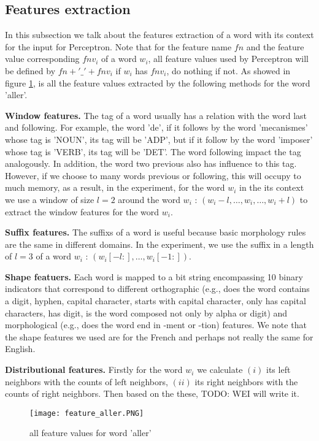\documentclass{article}
\begin{document}
\subsection{Features extraction}
In this subsection we talk about the features extraction of a word with its context for the input for Perceptron. Note that for the feature name $fn$ and  the feature value corresponding $fnv_i$ of a word $w_i$, all feature values used by Perceptron will be defined by $fn + '\_' + fnv_i$ if $w_i$ has $fnv_i$, do nothing if not. As showed in figure \ref{figure1}, is all the feature values extracted by the following methods for the word 'aller'.

\textbf{Window features.} The tag of a word usually has a relation with the word last and following. For example, the word 'de', if it follows by the word 'mecanismes' whose tag is 'NOUN', its tag will be 'ADP', but if it follow by the word 'imposer' whose tag is 'VERB', its tag will be 'DET'. The word following impact the tag analogously. In addition, the word two previous also has influence to this tag. However, if we choose to many words previous or following, this will occupy to much memory, as a result, in the experiment, for the word $w_i$ in the its context we use a window of size $l = 2$ around the word $w_i$ : $(w_i-l,\dots, w_i,\dots, w_i+l )$ to extract the window features for the word $w_i$.

\textbf{Suffix features.} The suffixs of a word is useful because basic morphology rules are the same in different domains. In the experiment, we use the suffix in a length of $l = 3$ of a word $w_i$ : $(w_i[-l:],\dots,w_i[-1:])$. 

\textbf{Shape featuers.} Each word is mapped to a bit string encompassing 10 binary indicators that correspond to different orthographic (e.g., does the word contains a digit, hyphen, capital character, starts with capital character, only has capital characters, has digit, is the word composed not only by alpha or digit) and morphological (e.g., does the word end in -ment or -tion) features. We note that the shape features we used are for the French and perhaps not really the same for English. 

\textbf{Distributional features.} Firstly for the word $w_i$ we calculate $(i)$ its left neighbors with the counts of left neighbors, $(ii)$ its right neighbors with the counts of right neighbors. Then based on the these, TODO: WEI will write it.

\begin{figure}[ht]
\centering
\texttt{[image: feature\_aller.PNG]}
\caption{all feature values for word 'aller'}
\label{figure1}
\end{figure}
\end{document}
